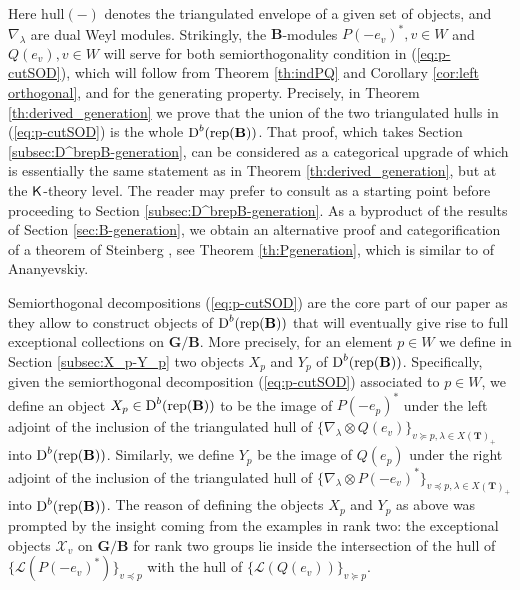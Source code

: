 \documentclass[sn-mathphys-num]{sn-jnl}%
\newcommand{\tX}{{\mathcal X}}
\newcommand{\Ll}{\mathcal L}
\newcommand{\rep}{{\mathrm{rep}}}
\newcommand{\hull}{{\mathrm{hull}}}
\newcommand*{\Dd}{\mathop{\mathrm D\kern0pt}\nolimits}
\newcommand{\bg}{\mathbf G}
\newcommand{\fb}{\mathbf B}
\newcommand{\bt}{\mathbf T}
\theoremstyle{definition}
\begin{document}
Here $\hull(-)$ denotes the triangulated envelope of a given set of objects, and $\nabla_\lambda$ are dual Weyl modules. Strikingly, the $\fb$-modules $P(-e_v)^*, v\in W$ and $Q(e_v), v\in W$ will serve for both semiorthogonality condition in (\ref{eq:p-cutSOD}), which will follow from Theorem \ref{th:indPQ} and Corollary \ref{cor:left orthogonal}, and for the generating property. Precisely, in Theorem \ref{th:derived_generation} 
we prove that the union of the two triangulated hulls in (\ref{eq:p-cutSOD}) is the whole $\Dd ^b(\rep( \fb))$. That proof, which takes Section \ref{subsec:D^brepB-generation}, can be considered as a categorical upgrade of 
\cite[Theorem 2]{Ana} which is essentially the same statement as in Theorem \ref{th:derived_generation}, but at the $\sf K$-theory level. The reader may prefer to consult \cite[Theorem 2 and Section 4]{Ana} as a starting point before proceeding to Section \ref{subsec:D^brepB-generation}. As a byproduct of the results of Section \ref{sec:B-generation}, we obtain an alternative proof and categorification of a theorem of Steinberg \cite{St}, see Theorem \ref{th:Pgeneration}, which is similar to \cite[Theorem 2]{Ana} of Ananyevskiy.

Semiorthogonal decompositions (\ref{eq:p-cutSOD}) are the core part of our paper as they allow to construct objects of $\Dd ^b(\rep( \fb))$ that will eventually give rise to full exceptional collections on $\bg/\fb$. More precisely, for an element $p\in W$ we define in Section \ref{subsec:X_p-Y_p} two objects $X_p$ and $Y_p$ of $\Dd ^b(\rep( \fb))$. Specifically, given the semiorthogonal decomposition (\ref{eq:p-cutSOD}) associated to $p\in W$, we define an object $X_p\in \Dd ^b(\rep( \fb))$ to be the image of $P(-e_p)^*$ under the left adjoint of the inclusion of the triangulated hull of $\{\nabla_\lambda\otimes Q(e_v)\}_{v\succeq  p,\lambda\in X( \bt)_+}$ into $\Dd ^b(\rep( \fb))$. Similarly, we define $Y_p$ be the image of $Q(e_p)$ under the right adjoint of the inclusion of the triangulated hull of $\{\nabla_\lambda\otimes P(-e_v)^*\}_{v\preceq p,\lambda\in X( \bt)_+}$ 
into $\Dd ^b(\rep( \fb))$. The reason of defining the objects $X_p$ and $Y_p$ as above was prompted by the insight coming from the examples in rank two: the exceptional objects $\tX_v$ on $\bg/\fb$ for rank two groups lie inside the intersection  of the hull of $\{\Ll(P(-e_v)^*)\}_{v\preceq p}$ with the hull of $\{\Ll(Q(e_v))\}_{v\succeq p}$. 
\end{document}
